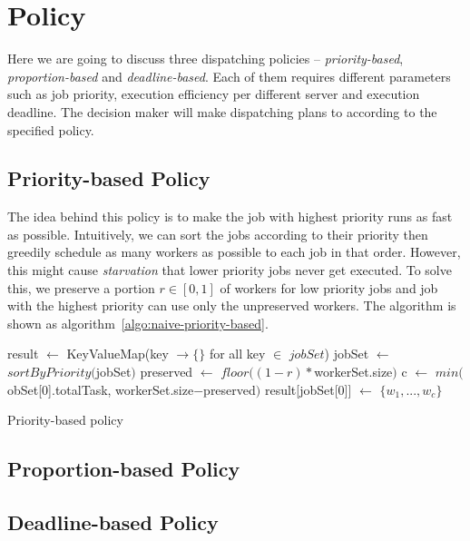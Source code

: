 \chapter{Policy}

Here we are going to discuss three dispatching policies --
\emph{priority-based}, \emph{proportion-based} and
\emph{deadline-based}.
Each of them requires different parameters such as job priority,
execution efficiency per different server and execution deadline.
The decision maker will make dispatching plans to according
to the specified policy.


\section{Priority-based Policy}

The idea behind this policy is to make the job with highest priority
runs as fast as possible.
Intuitively, we can sort the jobs according to their priority then
greedily schedule as many workers as possible to each job in that order.
However, this might cause \emph{starvation} that lower priority jobs
never get executed.
To solve this, we preserve a portion $r \in [0,1]$ of workers for low
priority jobs and job with the highest priority can use only the
unpreserved workers.
The algorithm is shown as algorithm~\ref{algo:naive-priority-based}.

\begin{algorithm}
  \DontPrintSemicolon %
  result $\gets$ KeyValueMap(key $\to \{\}$ for all key $\in$ $jobSet$)\;
  jobSet $\gets$ $sortByPriority($jobSet$)$\;
  preserved $\gets$ $floor((1-r) * $workerSet.size$)$\;
  c $\gets$ $min($obSet[0].totalTask, workerSet.size$-$preserved$)$\;
  result[jobSet[0]] $\gets$ $\{w_1, ..., w_c\}$\;
  \;
  \caption{Priority-based policy}
  \label{algo:naive-priority-based}
\end{algorithm}

\section{Proportion-based Policy}

\section{Deadline-based Policy}

